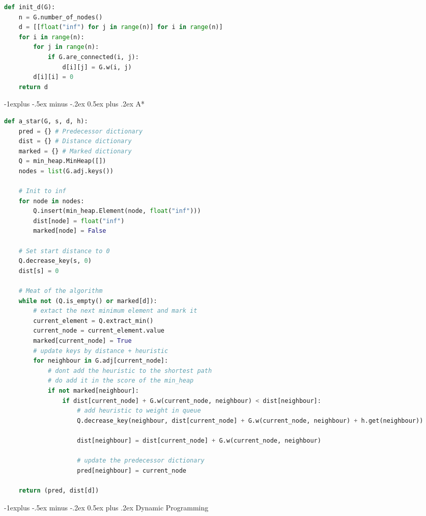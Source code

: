\documentclass[letterpaper, 8pt]{extarticle}
\makeatletter
\renewcommand{\section}{\@startsection{section}{1}{0mm}%
                                {-1explus -.5ex minus -.2ex}%
                                {0.5ex plus .2ex}%
                                {\normalfont\normalsize\bfseries}}
\renewcommand{\subsection}{\@startsection{subsection}{2}{0mm}%
                                {-1explus -.5ex minus -.2ex}%
                                {0.5ex plus .2ex}%
                                {\normalfont\small\bfseries}}
\makeatother
\begin{document}
\begin{multicols*}{5}
\begin{lstlisting}[language=Python]
def init_d(G):
    n = G.number_of_nodes()
    d = [[float("inf") for j in range(n)] for i in range(n)]
    for i in range(n):
        for j in range(n):
            if G.are_connected(i, j):
                d[i][j] = G.w(i, j)
        d[i][i] = 0
    return d
\end{lstlisting}


\subsection{A*}
\begin{lstlisting}[language=Python]
def a_star(G, s, d, h):
    pred = {} # Predecessor dictionary
    dist = {} # Distance dictionary
    marked = {} # Marked dictionary
    Q = min_heap.MinHeap([])
    nodes = list(G.adj.keys())

    # Init to inf
    for node in nodes:
        Q.insert(min_heap.Element(node, float("inf")))
        dist[node] = float("inf")
        marked[node] = False
    
    # Set start distance to 0
    Q.decrease_key(s, 0)
    dist[s] = 0

    # Meat of the algorithm
    while not (Q.is_empty() or marked[d]):
        # extact the next minimum element and mark it
        current_element = Q.extract_min()
        current_node = current_element.value
        marked[current_node] = True
        # update keys by distance + heuristic
        for neighbour in G.adj[current_node]:
            # dont add the heuristic to the shortest path
            # do add it in the score of the min_heap
            if not marked[neighbour]:
                if dist[current_node] + G.w(current_node, neighbour) < dist[neighbour]:
                    # add heuristic to weight in queue
                    Q.decrease_key(neighbour, dist[current_node] + G.w(current_node, neighbour) + h.get(neighbour))
                    
                    dist[neighbour] = dist[current_node] + G.w(current_node, neighbour)
                    
                    # update the predecessor dictionary
                    pred[neighbour] = current_node
        
    return (pred, dist[d])
\end{lstlisting}


\section{Dynamic Programming}

\end{multicols*}
\end{document}

